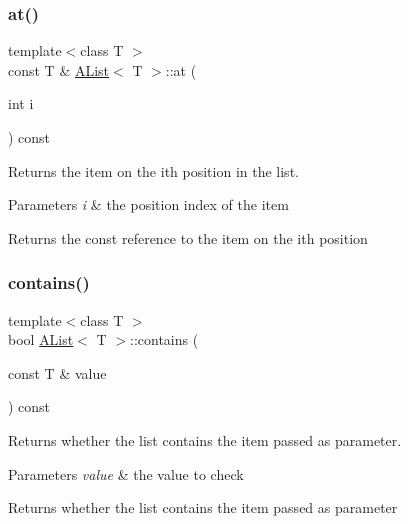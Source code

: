 \subsubsection{\texorpdfstring{at()}{at()}\hspace{0.1cm}{\footnotesize\ttfamily [2/2]}}
{\footnotesize\ttfamily template$<$class T $>$ \\
const T \& \mbox{\hyperlink{class_a_list}{A\+List}}$<$ T $>$\+::at (\begin{DoxyParamCaption}\item[{int}]{i }\end{DoxyParamCaption}) const}



Returns the item on the ith position in the list. 


\begin{DoxyParams}{Parameters}
{\em i} & the position index of the item \\
\hline
\end{DoxyParams}
\begin{DoxyReturn}{Returns}
the const reference to the item on the ith position 
\end{DoxyReturn}
\mbox{\label{class_a_list_ab3db4e8f60d5abf4e7a12d928fb244a0}} 
\subsubsection{\texorpdfstring{contains()}{contains()}}
{\footnotesize\ttfamily template$<$class T $>$ \\
bool \mbox{\hyperlink{class_a_list}{A\+List}}$<$ T $>$\+::contains (\begin{DoxyParamCaption}\item[{const T \&}]{value }\end{DoxyParamCaption}) const\hspace{0.3cm}{\ttfamily [inline]}}



Returns whether the list contains the item passed as parameter. 


\begin{DoxyParams}{Parameters}
{\em value} & the value to check \\
\hline
\end{DoxyParams}
\begin{DoxyReturn}{Returns}
whether the list contains the item passed as parameter 
\end{DoxyReturn}
\mbox{\label{class_a_list_a4769f724fc264fae0cd1ebbc6f70ec2e}} 
